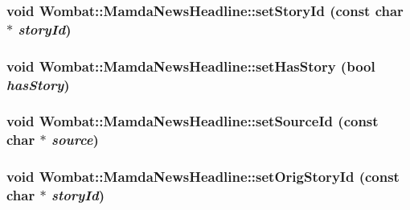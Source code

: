 \hypertarget{classWombat_1_1MamdaNewsHeadline_c45497cfe5d556c3dda648489c025b6a}{
\subsubsection[setStoryId]{\setlength{\rightskip}{0pt plus 5cm}void Wombat::Mamda\-News\-Headline::set\-Story\-Id (const char $\ast$ {\em story\-Id})}}
\label{classWombat_1_1MamdaNewsHeadline_c45497cfe5d556c3dda648489c025b6a}


\hypertarget{classWombat_1_1MamdaNewsHeadline_74ac75438bdf3e53495dd1c46593158f}{
\subsubsection[setHasStory]{\setlength{\rightskip}{0pt plus 5cm}void Wombat::Mamda\-News\-Headline::set\-Has\-Story (bool {\em has\-Story})}}
\label{classWombat_1_1MamdaNewsHeadline_74ac75438bdf3e53495dd1c46593158f}


\hypertarget{classWombat_1_1MamdaNewsHeadline_945595e4cf59801051732152fe04e4d6}{
\subsubsection[setSourceId]{\setlength{\rightskip}{0pt plus 5cm}void Wombat::Mamda\-News\-Headline::set\-Source\-Id (const char $\ast$ {\em source})}}
\label{classWombat_1_1MamdaNewsHeadline_945595e4cf59801051732152fe04e4d6}


\hypertarget{classWombat_1_1MamdaNewsHeadline_4e30f708d50dfb7f96c0f585333e5833}{
\subsubsection[setOrigStoryId]{\setlength{\rightskip}{0pt plus 5cm}void Wombat::Mamda\-News\-Headline::set\-Orig\-Story\-Id (const char $\ast$ {\em story\-Id})}}
\label{classWombat_1_1MamdaNewsHeadline_4e30f708d50dfb7f96c0f585333e5833}


